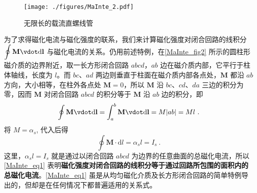 \begin{figure}[ht]
\centering
\texttt{[image: ./figures/MaInte\_2.pdf]}
\caption{无限长的载流直螺线管} \label{MaInte_fig2}
\end{figure}
为了求得磁化电流与磁化强度的联系，我们来计算磁化强度对闭合回路的线积分 $\displaystyle \oint \mathbf M \vdot \mathrm{d} \mathbf l$ 与磁化电流的关系。仍用前述特例，在\autoref{MaInte_fig2} 所示的圆柱形磁介质的边界附近，取一长方形闭合回路 $abcd$，$ab $ 边在磁介质内部，它平行于柱体轴线，长度为 $l$。而 $bc$、$ad $ 两边则垂直于柱面在磁介质内部各点处，$\mathbf M$ 都沿 $ab $ 方向，大小相等，在柱外各点处 $\mathbf M=0$，所以 $\mathbf M $ 沿 $bc$、$cd$、$da $ 三边的积分为零，因而 $\mathbf M $ 对闭合回路 $abcd$ 的积分等于 $\mathbf M $ 沿 $ab $ 边的积分，即
\begin{equation}
\oint \mathbf{M}\vdot  \mathrm{d} \mathbf{l}=\int_{a}^{b} \mathbf{M} \vdot  \mathrm{d} \mathbf{l}=M|a b|=M l~.
\end{equation}
将 $M=\alpha_s$, 代入后得
\begin{equation} \label{MaInte_eq1}
\oint \mathbf M \cdot \mathrm{d} l=\alpha_{s} l=I_{s}~.
\end{equation}
这里，$\alpha_sl=I_s$ 就是通过以闭合回路 $abcd$ 为边界的任意曲面的总磁化电流，所以\autoref{MaInte_eq1} 表明\textbf{磁化强度对闭合回路的线积分等于通过回路所包围的面积内的总磁化电流}。\autoref{MaInte_eq1} 虽是从均匀磁化介质及长方形闭合回路的简单特例导出的，但却是在任何情况下都普遍适用的关系式。
